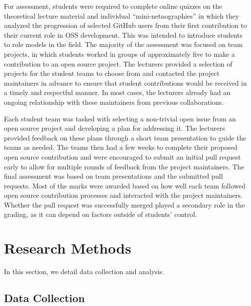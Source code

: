 \documentclass[sigconf]{acmart}
\begin{document}
\begin{sloppy}
For assessment, students were required to complete online quizzes on the theoretical lecture material and individual ``mini-netnographies'' in which they analyzed the progression of selected GitHub users from their first contribution to their current role in OSS development. This was intended to introduce students to role models in the field. The majority of the assessment was focused on team projects, in which students worked in groups of approximately five to make a contribution to an open source project. The lecturers provided a selection of projects for the student teams to choose from and contacted the project maintainers in advance to ensure that student contributions would be received in a timely and respectful manner. In most cases, the lecturers already had an ongoing relationship with these maintainers from previous collaborations.

Each student team was tasked with selecting a non-trivial open issue from an open source project and developing a plan for addressing it. The lecturers provided feedback on these plans through a short team presentation to guide the teams as needed. The teams then had a few weeks to complete their proposed open source contribution and were encouraged to submit an initial pull request early to allow for multiple rounds of feedback from the project maintainers. The final assessment was based on team presentations and the submitted pull requests. Most of the marks were awarded based on how well each team followed open source contribution processes and interacted with the project maintainers. Whether the pull request was successfully merged played a secondary role in the grading, as it can depend on factors outside of students' control.

\section{Research Methods}

In this section, we detail data collection and analysis.




\subsection{Data Collection}


\end{sloppy}
\end{document}

